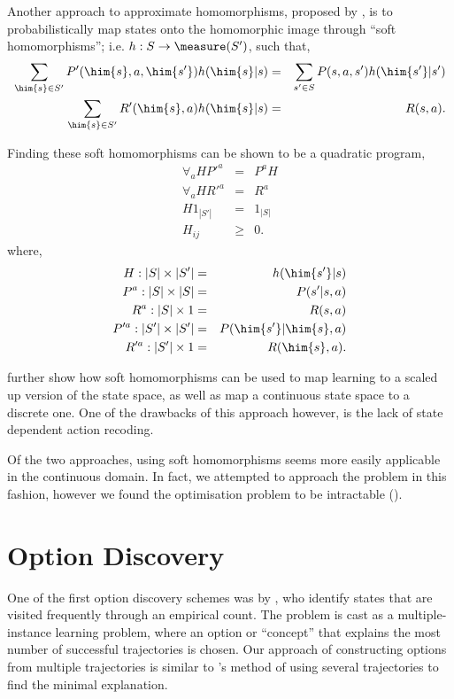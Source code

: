 Another approach to approximate homomorphisms, proposed by
\citet{Sorg2009}, is to probabilistically map states onto the
homomorphic image through ``soft homomorphisms''; i.e. $h: S \to
\measure(S')$, such that,
\begin{eqnarray*}
  \sum_{\him{s} \in S'} P'(\him{s},a,\him{s'}) h(\him{s}|s)  &=& \sum_{s' \in S} P(s,a,s') h(\him{s'}|s') \\
  \sum_{\him{s} \in S'} R'(\him{s},a) h(\him{s}|s)  &=& R(s,a).
\end{eqnarray*}

Finding these soft homomorphisms can be shown to be a quadratic program,
\begin{eqnarray*}
  \forall_a H P'^a &=& P^a H \\
  \forall_a H R'^a &=& R^a \\
  H 1_{|S'|}  &=& 1_{|S|} \\
  H_{ij} &\ge& 0.
\end{eqnarray*}
\noindent
where,
\begin{eqnarray*}
  H: |S| \times |S'| &=& h(\him{s'}|s) \\
  P^a: |S| \times |S| &=& P(s'|s,a) \\
  R^a: |S| \times 1 &=& R(s,a) \\
  P'^a: |S'| \times |S'| &=& P(\him{s'}|\him{s},a) \\
  R'^a: |S'| \times 1 &=& R(\him{s},a).
\end{eqnarray*}

\citet{Sorg2009} further show how soft homomorphisms can be used to map
learning to a scaled up version of the state space, as well as map
a continuous state space to a discrete one. One of the drawbacks of this
approach however, is the lack of state dependent action recoding. 

Of the two approaches, using soft homomorphisms seems more easily
applicable in the continuous domain. In fact, we attempted to approach
the problem in this fashion, however we found the optimisation problem
to be intractable ().

\section{Option Discovery}
\label{sec:related-work:options}

One of the first option discovery schemes was by \citet{McGovern2001},
who identify states that are visited frequently through an empirical
count. The problem is cast as a multiple-instance learning problem,
where an option or ``concept'' that explains the most number of
successful trajectories is chosen. Our approach of constructing options
from multiple trajectories is similar to \citet{McGovern2001}'s method
of using several trajectories to find the minimal explanation.

